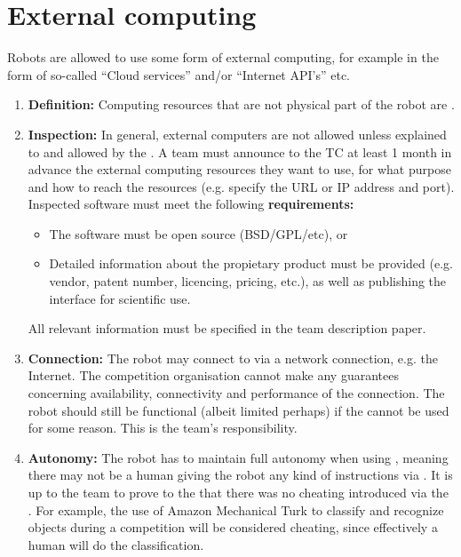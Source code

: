 \section{External computing}\label{rule:robot_external_computing}
Robots are allowed to use some form of external computing, for example in the form of so-called ``Cloud services'' and/or ``Internet API's'' etc. 
\begin{enumerate}
	\item \textbf{Definition:} Computing resources that are not physical part of the robot are . 
	\item \textbf{Inspection:} In general, external computers are not allowed unless explained to and allowed by the .
	  A team must announce to the TC at least 1 month in advance the external computing resources they want to use, for what purpose and how to reach the resources (e.g. specify the URL or IP address and port). Inspected software must meet the following \textbf{requirements:}
	  \begin{itemize}
	  	\item The software must be open source (BSD/GPL/etc), or
        \item Detailed information about the propietary product must be provided (e.g. vendor, patent number, licencing, pricing, etc.), as well as publishing the interface for scientific use.
	  \end{itemize}
	All relevant information must be specified in the team description paper.
	\item \textbf{Connection:} The robot may connect to  via a network connection, e.g. the Internet. 
	  The competition organisation cannot make any guarantees concerning availability, connectivity and performance of the connection. 
	  The robot should still be functional (albeit limited perhaps) if the  cannot be used for some reason.
	  This is the team's responsibility. 
	\item \textbf{Autonomy:} The robot has to maintain full autonomy when using , 
	  meaning there may not be a human giving the robot any kind of instructions via .
	  It is up to the team to prove to the  that there was no cheating introduced via the . 
	  For example, the use of Amazon Mechanical Turk to classify and recognize objects during a competition will be considered cheating, since effectively a human will do the classification.

\end{enumerate}
